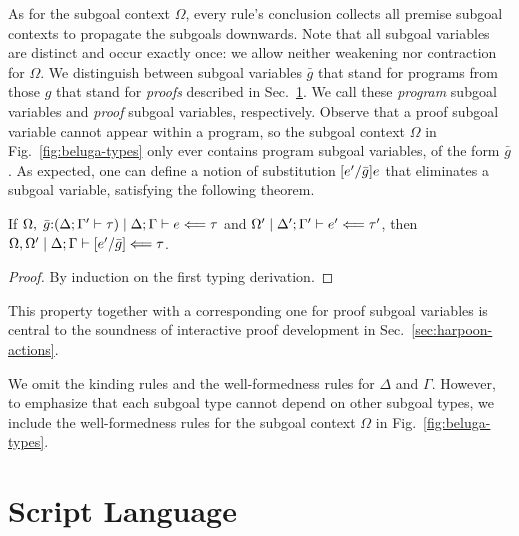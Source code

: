 As for the subgoal context $\Omega$, every rule's conclusion collects all
premise subgoal contexts to propagate the subgoals downwards.
Note that all subgoal variables are distinct and occur exactly once: we
allow neither weakening nor contraction for $\Omega$.
We distinguish between subgoal variables $\bar g$ that stand for programs from
those $g$ that stand for \emph{proofs} described in Sec.~\ref{sec:harpoon}.
We call these \emph{program} subgoal variables and \emph{proof} subgoal
variables, respectively.
Observe that a proof subgoal variable cannot appear within a program,
so the subgoal context $\Omega$ in Fig.~\ref{fig:beluga-types} only ever
contains program subgoal variables, of the form $\bar g$.
As expected, one can define a notion of substitution $[e^\prime/\bar g]e$
that eliminates a subgoal variable, satisfying the following theorem.

\begin{thm}
  If $\Omega,\; \bar g{:}(\Delta; \Gamma^\prime \vdash \tau)\mid\Delta; \Gamma \vdash e \Longleftarrow \tau$
  and $\Omega^\prime\mid\Delta^\prime; \Gamma^\prime \vdash e^\prime \Longleftarrow \tau^\prime$,
  then $\Omega,\Omega^\prime\mid\Delta; \Gamma \vdash [e^\prime/\bar g]\Longleftarrow \tau$.
\end{thm}

\begin{proof}
  By induction on the first typing derivation.
\end{proof}

This property together with a corresponding one for proof subgoal variables is
central to the soundness of interactive proof development in
Sec.~\ref{sec:harpoon-actions}.

We omit the kinding rules and the well-formedness rules for
$\Delta$ and $\Gamma$. However, to emphasize that each subgoal type
cannot depend on other subgoal types, we include the well-formedness
rules for the subgoal context $\Omega$ in Fig.~\ref{fig:beluga-types}.

\section{\Harpoon{} Script Language}
\label{sec:harpoon}

